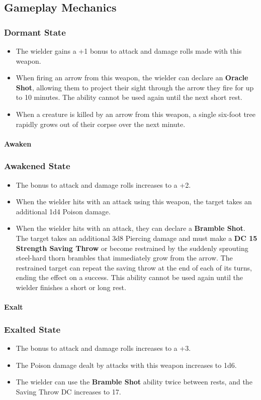 \subsection*{Gameplay Mechanics}
{\entryfont
\subsubsection*{Dormant State}
\begin{itemize}
	\item The wielder gains a +1 bonus to attack and damage rolls made with this weapon.
	\item When firing an arrow from this weapon, the wielder can declare an \textbf{Oracle Shot}, allowing them to project their sight through the arrow they fire for up to 10 minutes. The ability cannot be used again until the next short rest.
	\item When a creature is killed by an arrow from this weapon, a single six-foot tree rapidly grows out of their corpse over the next minute.
\end{itemize}
\paragraph*{Awaken}
\subsubsection*{Awakened State}
\begin{itemize}
	\item The bonus to attack and damage rolls increases to a +2.
	\item When the wielder hits with an attack using this weapon, the target takes an additional 1d4 Poison damage.
	\item When the wielder hits with an attack, they can declare a \textbf{Bramble Shot}. The target takes an additional 3d8 Piercing damage and must make a \textbf{DC 15 Strength Saving Throw} or become restrained by the suddenly sprouting steel-hard thorn brambles that immediately grow from the arrow. The restrained target can repeat the saving throw at the end of each of its turns, ending the effect on a success. This ability cannot be used again until the wielder finishes a short or long rest.
\end{itemize}
\paragraph*{Exalt}
\subsubsection*{Exalted State}
\begin{itemize}
	\item The bonus to attack and damage rolls increases to a +3.
	\item The Poison damage dealt by attacks with this weapon increases to 1d6.
	\item The wielder can use the \textbf{Bramble Shot} ability twice between rests, and the Saving Throw DC increases to 17.
\end{itemize}}